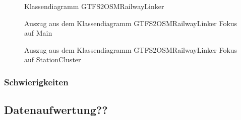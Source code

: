 \begin{figure}[htb]
   \centering
   \caption{Klassendiagramm GTFS2OSMRailwayLinker}
   \label{fig:gtfs2osm:uml_full}
 \end{figure}

\begin{figure}[htb]
   \centering
   \caption{Auszug aus dem Klassendiagramm GTFS2OSMRailwayLinker Fokus auf Main}
   \label{fig:gtfs2osm:uml_full}
 \end{figure}


\begin{figure}[htb]
   \centering
   \caption{Auszug aus dem Klassendiagramm GTFS2OSMRailwayLinker Fokus auf StationCluster}
   \label{fig:gtfs2osm:uml_full}
 \end{figure}


\subsubsection{Schwierigkeiten}
\subsection{Datenaufwertung??}
